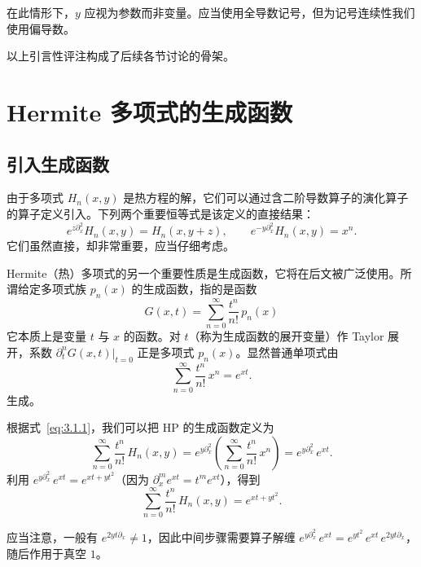  在此情形下，$y$ 应视为参数而非变量。应当使用全导数记号，但为记号连续性我们使用偏导数。

以上引言性评注构成了后续各节讨论的骨架。

\section{Hermite 多项式的生成函数}
\label{sec:3.2}

\subsection{引入生成函数}
\label{sec:3.2.1}

由于多项式 $H_n(x,y)$ 是热方程的解，它们可以通过含二阶导数算子的演化算子的算子定义引入。下列两个重要恒等式是该定义的直接结果：
\begin{equation}
e^{z\partial_x^2}H_n(x,y)=H_n(x,y+z),\qquad
e^{-y\partial_x^2}H_n(x,y)=x^n.
\label{eq:3.2.1}
\end{equation}
它们虽然直接，却非常重要，应当仔细考虑。

Hermite（热）多项式的另一个重要性质是生成函数，它将在后文被广泛使用。所谓给定多项式族 $p_n(x)$ 的生成函数，指的是函数
\begin{equation}
G(x,t)=\sum_{n=0}^{\infty}\frac{t^n}{n!}\,p_n(x)
\label{eq:3.2.2}
\end{equation}
它本质上是变量 $t$ 与 $x$ 的函数。对 $t$（称为生成函数的展开变量）作 Taylor 展开，系数 $\partial_t^n G(x,t)|_{t=0}$ 正是多项式 $p_n(x)$。显然普通单项式由
\begin{equation}
\sum_{n=0}^{\infty}\frac{t^n}{n!}\,x^n=e^{xt}.
\label{eq:3.2.3}
\end{equation}
生成。

根据式~\eqref{eq:3.1.1}，我们可以把 HP 的生成函数定义为
\[
\sum_{n=0}^{\infty}\frac{t^n}{n!}\,H_n(x,y)
=e^{y\partial_x^2}\!\left(\sum_{n=0}^{\infty}\frac{t^n}{n!}\,x^n\right)
=e^{y\partial_x^2}\,e^{xt}.
\]
利用 $e^{y\partial_x^2}\,e^{xt}=e^{xt+yt^2}$（因为 $\partial_x^m e^{xt}=t^m e^{xt}$），得到
\begin{equation}
\sum_{n=0}^{\infty}\frac{t^n}{n!}\,H_n(x,y)=e^{xt+yt^2}.
\label{eq:3.2.5}
\end{equation}

 应当注意，一般有 $e^{2yt\partial_x}\neq 1$，因此中间步骤需要算子解缠
$e^{y\partial_x^2}\,e^{xt}=e^{yt^2}\,e^{xt}\,e^{2yt\partial_x}$，随后作用于真空 $1$。

